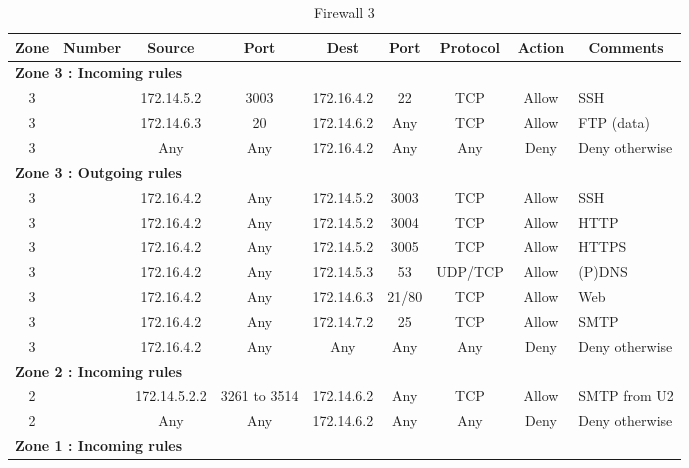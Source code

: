\documentclass[a4paper,titlepage]{article}
\begin{document}
\begin{table}[h]
	\center
	\begin{tabular}{c|c|cc|cc|ccl}
		Zone & Number & Source & Port & Dest & Port & Protocol & Action & \multicolumn{1}{c}{Comments}\\
		\hline
		\multicolumn{9}{l}{\textbf{Zone 3 : Incoming rules}}\\
		3 &  & 172.14.5.2 & 3003 & 172.16.4.2 & 22 & TCP & Allow & SSH\\
		3 &  & 172.14.6.3 & 20 & 172.14.6.2 & Any & TCP & Allow & FTP (data)\\
		3 &  & Any & Any & 172.16.4.2 & Any & Any & Deny & Deny otherwise\\

		\hline
		\multicolumn{9}{l}{\textbf{Zone 3 : Outgoing rules}}\\
		3 &  & 172.16.4.2 & Any & 172.14.5.2 & 3003 & TCP & Allow & SSH\\
		3 &  & 172.16.4.2 & Any & 172.14.5.2 & 3004 & TCP & Allow & HTTP\\
		3 &  & 172.16.4.2 & Any & 172.14.5.2 & 3005 & TCP & Allow & HTTPS\\
		3 &  & 172.16.4.2 & Any & 172.14.5.3 & 53 & UDP/TCP & Allow & (P)DNS\\
		3 &  & 172.16.4.2 & Any & 172.14.6.3 & 21/80 & TCP & Allow & Web\\
		3 &  & 172.16.4.2 & Any & 172.14.7.2 & 25 & TCP & Allow & SMTP\\
		3 &  & 172.16.4.2 & Any & Any & Any & Any & Deny & Deny otherwise\\

		\hline
		\multicolumn{9}{l}{\textbf{Zone 2 : Incoming rules}}\\
		2 &  & 172.14.5.2.2 & 3261 to 3514 & 172.14.6.2 & Any & TCP & Allow & SMTP from U2\\
		2 &  & Any & Any & 172.14.6.2 & Any & Any & Deny & Deny otherwise

		\hline
		\multicolumn{9}{l}{\textbf{Zone 2 : Outgoing rules}}\\

		\hline
		\multicolumn{9}{l}{\textbf{Zone 1 : Incoming rules}}\\


	\end{tabular}
	\caption{Firewall 3}
\end{table}
\end{document}
